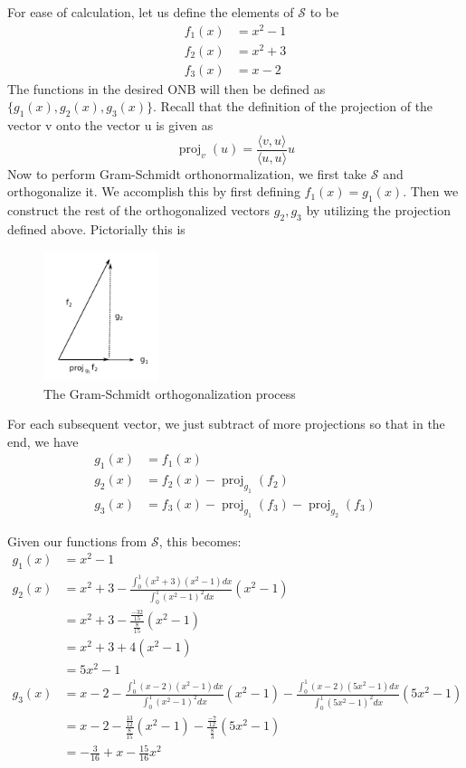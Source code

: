 \documentclass[a4paper, 11pt]{article}
\newcommand{\proj}[2]{\operatorname{proj}_{#2}(#1)}
\newenvironment{solution}{%
	\begin{list}{}{%
			\setlength{\topsep}{0pt}%
			\setlength{\leftmargin}{1.5cm}%
			\setlength{\rightmargin}{1.5cm}%
			\setlength{\listparindent}{\parindent}%
			\setlength{\itemindent}{\parindent}%
			\setlength{\parsep}{\parskip}%
		}%
		\item[]}{\end{list}}
\begin{document}
\begin{solution}
 \noindent For ease of calculation, let us define the elements of $\mathcal{S}$ to be
  \begin{align*}
    f_1(x) &= x^2-1\\
    f_2(x) &= x^2+3 \\
    f_3(x) &= x-2
  \end{align*}
  The functions in the desired ONB will then be defined as $\{g_1(x), g_2(x), g_3(x)\}$. Recall that the definition of the projection of the vector v onto the vector u is given as
  \begin{equation*}
    \proj{u}{v} = \frac{\langle v,u \rangle}{\langle u, u \rangle}u
  \end{equation*}
  Now to perform Gram-Schmidt orthonormalization, we first take $\mathcal{S}$ and orthogonalize it. We accomplish this by first defining $f_1(x)=g_1(x)$. Then we construct the rest of the orthogonalized vectors $g_2, g_3$ by utilizing the projection defined above. Pictorially this is
  \begin{figure}[!hbt]
    \centering
    \includegraphics[width=0.3\textwidth]{gramSchmidt.pdf}
    \caption{The Gram-Schmidt orthogonalization process}
    \label{fig:gramSchmidt}
  \end{figure}
  For each subsequent vector, we just subtract of more projections so that in the end, we have
  \begin{align*}
    g_1(x) &= f_1(x) \\
    g_2(x) &= f_2(x)-\proj{f_2}{g_1}\\
    g_3(x) &= f_3(x)-\proj{f_3}{g_1}-\proj{f_3}{g_2}
  \end{align*}

  \noindent Given our functions from $\mathcal{S}$, this becomes:
  \begin{align*}
    g_1(x) &= x^2-1\\
    g_2(x) &= x^2+3 - \frac{\int_0^1(x^2+3)(x^2-1)dx}{\int_0^1(x^2-1)^2dx}(x^2-1) \\
    &= x^2+3 - \frac{\frac{-32}{15}}{\frac{8}{15}}(x^2-1) \\
    &= x^2+3+4(x^2-1) \\
    &= 5x^2-1 \\
    g_3(x) &= x-2 - \frac{\int_0^1(x-2)(x^2-1)dx}{\int_0^1(x^2-1)^2dx}(x^2-1) - \frac{\int_0^1(x-2)(5x^2-1)dx}{\int_0^1(5x^2-1)^2dx}(5x^2-1)\\
    &= x-2 - \frac{\frac{13}{12}}{\frac{8}{15}}(x^2-1) -\frac{\frac{-7}{12}}{\frac{8}{3}}(5x^2-1)\\
    &= -\frac{3}{16}+x-\frac{15}{16}x^2 
  \end{align*}


\end{solution}
\end{document}
